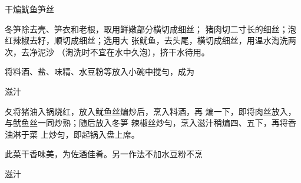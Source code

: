 \begin{recipe}{干煸鱿鱼笋丝}

\ingredients


\cooking

\step 冬笋除去壳、笋衣和老根，取用鲜嫩部分横切成细丝； 猪肉切二寸长的细丝；泡红辣椒去籽，顺切成细丝；选用大 张鱿鱼，去头尾，横切成细丝，用温水淘洗两次，去净泥沙 （淘洗时不宜在水中久泡），挤干水待用。

\step 将料酒、盐、味精、水豆粉等放入小碗中搅勻，成为

滋汁

夂将猪油入锅烧红，放入鱿鱼丝煸炒后，烹入料酒，再 煸一下，即将肉丝放入，与鱿鱼丝一同炒熟；随后放入冬笋 辣椒丝炒勻，烹入滋汁稍煸四、五下，再将香油淋于菜 上炒匀，即起锅入盘上席。

\notes

此菜干香味美，为佐酒佳肴。另一作法不加水豆粉不烹

滋汁

\end{recipe}

